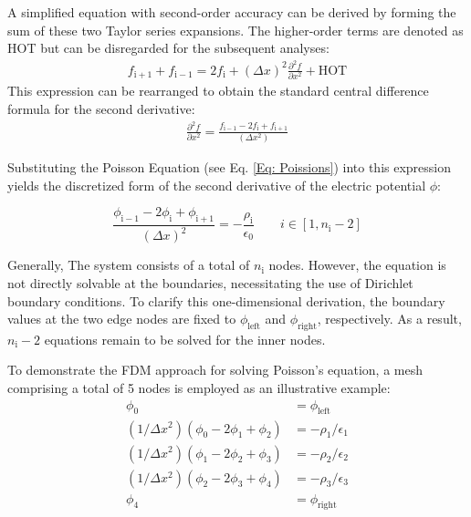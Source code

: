 A simplified equation with second-order accuracy can be derived by forming the sum of these two Taylor series expansions. The higher-order terms are denoted as \acs{HOT} but can be disregarded for the subsequent analyses:
\begin{align}    
f_{\mathrm{i+1}} + f_{\mathrm{i-1}} = 2 f_{\mathrm{i}} + (\Delta x)^2 \frac{\partial^2 f}{\partial x^2} + \text{HOT}
\end{align}
This expression can be rearranged to obtain the standard central difference formula for the second derivative:
\begin{align}
\frac{\partial^2 f}{\partial x^2} = \frac{f_\mathrm{i-1} - 2f_\mathrm{i} + f_\mathrm{i+1}}{(\Delta x^2)}
\end{align}

Substituting the Poisson Equation (see Eq. \ref{Eq: Poissions}) into this expression yields the discretized form of the second derivative of the electric potential $\phi$:

\begin{equation}\label{Eq: Discrete Poisson}
\frac{\phi_{\mathrm{i-1}} - 2\phi_{\mathrm{i}} + \phi_{\mathrm{i+1}}}{(\Delta x)^2} = -\frac{\rho_{\mathrm{i}}}{\epsilon_0} \quad\quad i \in [1, n_\mathrm{i} - 2]
\end{equation}

Generally, The system consists of a total of $n_\mathrm{i}$ nodes. However, the equation is not directly solvable at the boundaries, necessitating the use of Dirichlet boundary conditions. To clarify this one-dimensional derivation, the boundary values at the two edge nodes are fixed to $\phi_\mathrm{left}$ and $\phi_\mathrm{right}$, respectively. As a result, $n_\mathrm{i} -2$ equations remain to be solved for the inner nodes.

To demonstrate the \acs{FDM} approach for solving Poisson's equation, a mesh comprising a total of 5 nodes is employed as an illustrative example:
\begin{align}
    \phi_0 &= \phi_{\text{left}} \\
    (1 / \Delta x^2)(\phi_0 - 2\phi_1 + \phi_2) &= -\rho_1 / \epsilon_1 \\
    (1 / \Delta x^2)(\phi_1 - 2\phi_2 + \phi_3) &= -\rho_2 / \epsilon_2 \\
    (1 / \Delta x^2)(\phi_2 - 2\phi_3 + \phi_4) &= -\rho_3 / \epsilon_3 \\
    \phi_4 &= \phi_{\text{right}}
\end{align}


